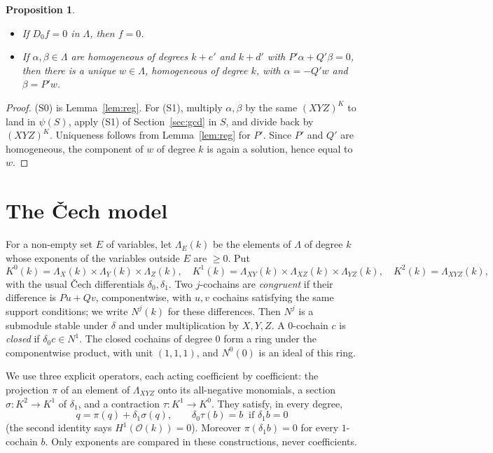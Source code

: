\documentclass[11pt]{amsart}
\newtheorem{proposition}[theorem]{Proposition}
\theoremstyle{definition}
\theoremstyle{remark}
\newcommand{\La}{\Lambda}
\begin{document}
\begin{proposition}\label{prop:S}
\begin{itemize}
\item[(S0)] If $D_0f=0$ in $\La$, then $f=0$.
\item[(S1)] If $\alpha,\beta\in\La$ are homogeneous of degrees $k+e'$ and
  $k+d'$ with $P'\alpha+Q'\beta=0$, then there is a unique $w\in\La$,
  homogeneous of degree $k$, with $\alpha=-Q'w$ and $\beta=P'w$.
\end{itemize}
\end{proposition}
\begin{proof}
(S0) is Lemma~\ref{lem:reg}. For (S1), multiply $\alpha,\beta$ by the same
$(XYZ)^K$ to land in $\psi(S)$, apply (S1) of Section~\ref{sec:gcd} in $S$,
and divide back by $(XYZ)^K$. Uniqueness follows from Lemma~\ref{lem:reg}
for $P'$. Since $P'$ and $Q'$ are homogeneous, the component of $w$ of
degree $k$ is again a solution, hence equal to $w$.
\end{proof}

\section{The \v{C}ech model}\label{sec:cech}

For a non-empty set $E$ of variables, let $\La_E(k)$ be the elements of
$\La$ of degree $k$ whose exponents of the variables outside $E$ are
$\ge0$. Put
\[
 K^0(k)=\La_X(k)\times\La_Y(k)\times\La_Z(k),\quad
 K^1(k)=\La_{XY}(k)\times\La_{XZ}(k)\times\La_{YZ}(k),\quad
 K^2(k)=\La_{XYZ}(k),
\]
with the usual \v{C}ech differentials $\delta_0,\delta_1$. Two $j$-cochains
are \emph{congruent} if their difference is $Pu+Qv$, componentwise, with
$u,v$ cochains satisfying the same support conditions; we write $N^j(k)$ for
these differences. Then $N^j$ is a submodule stable under $\delta$ and under
multiplication by $X,Y,Z$. A $0$-cochain $c$ is \emph{closed} if
$\delta_0c\in N^1$. The closed cochains of degree $0$ form a ring under the
componentwise product, with unit $(1,1,1)$, and $N^0(0)$ is an ideal of this
ring.

We use three explicit operators, each acting coefficient by coefficient:
the projection $\pi$ of an element of $\La_{XYZ}$ onto its all-negative
monomials, a section $\sigma:K^2\to K^1$ of $\delta_1$, and a contraction
$\tau:K^1\to K^0$. They satisfy, in every degree,
\[
 q=\pi(q)+\delta_1\sigma(q),\qquad
 \delta_0\tau(b)=b\ \text{ if }\delta_1b=0
\]
(the second identity says $H^1(\mathcal O(k))=0$). Moreover
$\pi(\delta_1b)=0$ for every $1$-cochain $b$. Only exponents are compared
in these constructions, never coefficients.
\end{document}
